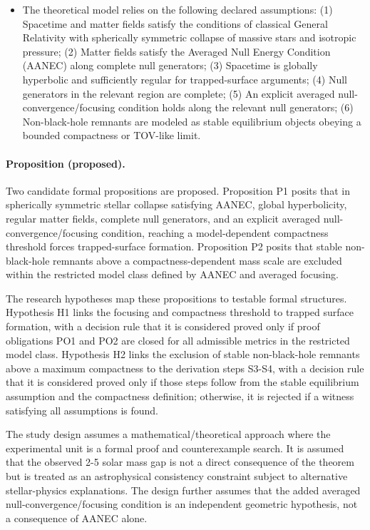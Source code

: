 \documentclass[conference]{IEEEtran}
\begin{document}
\begin{itemize}
\item The theoretical model relies on the following declared assumptions: (1) Spacetime and matter fields satisfy the conditions of classical General Relativity with spherically symmetric collapse of massive stars and isotropic pressure; (2) Matter fields satisfy the Averaged Null Energy Condition (AANEC) along complete null generators; (3) Spacetime is globally hyperbolic and sufficiently regular for trapped-surface arguments; (4) Null generators in the relevant region are complete; (5) An explicit averaged null-convergence/focusing condition holds along the relevant null generators; (6) Non-black-hole remnants are modeled as stable equilibrium objects obeying a bounded compactness or TOV-like limit.
\end{itemize}

\paragraph{Proposition (proposed).} Two candidate formal propositions are proposed. Proposition P1 posits that in spherically symmetric stellar collapse satisfying AANEC, global hyperbolicity, regular matter fields, complete null generators, and an explicit averaged null-convergence/focusing condition, reaching a model-dependent compactness threshold forces trapped-surface formation. Proposition P2 posits that stable non-black-hole remnants above a compactness-dependent mass scale are excluded within the restricted model class defined by AANEC and averaged focusing.

The research hypotheses map these propositions to testable formal structures. Hypothesis H1 links the focusing and compactness threshold to trapped surface formation, with a decision rule that it is considered proved only if proof obligations PO1 and PO2 are closed for all admissible metrics in the restricted model class. Hypothesis H2 links the exclusion of stable non-black-hole remnants above a maximum compactness to the derivation steps S3-S4, with a decision rule that it is considered proved only if those steps follow from the stable equilibrium assumption and the compactness definition; otherwise, it is rejected if a witness satisfying all assumptions is found.

The study design assumes a mathematical/theoretical approach where the experimental unit is a formal proof and counterexample search. It is assumed that the observed 2-5 solar mass gap is not a direct consequence of the theorem but is treated as an astrophysical consistency constraint subject to alternative stellar-physics explanations. The design further assumes that the added averaged null-convergence/focusing condition is an independent geometric hypothesis, not a consequence of AANEC alone.
\end{document}
